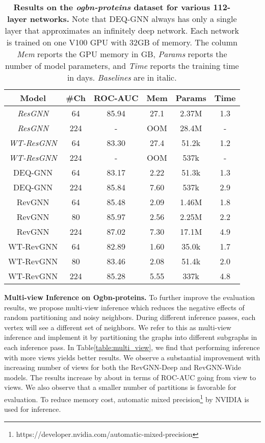 \documentclass{article}
\newcommand{\tblLabel}{Table\xspace}
\newcommand{\mysection}[1]{\vspace{0pt}\noindent\textbf{#1.}}
\begin{document}
\begin{table}[t]
\centering
\setlength{\tabcolsep}{2pt}
\caption{\textbf{Results on the \emph{ogbn-proteins} dataset for various 112-layer networks.} Note that DEQ-GNN always has only a single layer that approximates an infinitely deep network. Each network is trained on one V100 GPU with 32GB of memory. The column \emph{Mem} reports the GPU memory in GB, \emph{Params} reports the number of model parameters, and \emph{Time} reports the training time in days. \textit{Baselines} are in italic.}
\vspace{2pt}
\begin{tabular}{cccccc}
\toprule
  \label{table:ogbn_proteins_ablation}
  \centering
Model & \#Ch & ROC-AUC   & Mem  & Params & Time  \\
\midrule
\textit{ResGNN} & 64 & 85.94 & 27.1 
& 2.37M & 1.3 \\
\textit{ResGNN} & 224 & - & OOM 
& 28.4M & - \\
\midrule
\textit{WT-ResGNN} & 64 & 83.30 & 27.4
& 51.2k & 1.2 \\
\textit{WT-ResGNN} & 224 & - & OOM  
& 537k & - \\
\midrule
DEQ-GNN & 64 & 83.17 & 2.22 
& 51.3k & 1.3 \\
DEQ-GNN & 224 & 85.84 & 7.60 
& 537k & 2.9 \\
\midrule
RevGNN & 64 & 85.48 & 2.09
& 1.46M & 1.8 \\
RevGNN & 80 & 85.97 & 2.56 
& 2.25M & 2.2 \\
RevGNN & 224 & 87.02 & 7.30
& 17.1M & 4.9 \\
\midrule
WT-RevGNN & 64 & 82.89 & 1.60 
& 35.0k & 1.7 \\
WT-RevGNN & 80 & 83.46 & 2.08 
& 51.4k & 2.0 \\
WT-RevGNN & 224 & 85.28 & 5.55 
& 337k & 4.8 \\
\bottomrule
\end{tabular}
\end{table}

\mysection{Multi-view Inference on Ogbn-proteins}
To further improve the evaluation results, we propose multi-view inference which reduces the negative effects of random partitioning and noisy neighbors. During different inference passes, each vertex will see a different set of neighbors. We refer to this as multi-view inference and implement it by partitioning the graphs into different subgraphs in each inference pass. 
In \tblLabel \ref{table:multi_view}, we find that performing inference with more views yields better results. We observe a substantial improvement with increasing number of views for both the RevGNN-Deep and RevGNN-Wide models. The results increase by about  in terms of ROC-AUC going from  view to  views. We also observe that a smaller number of partitions is favorable for evaluation. To reduce memory cost, automatic mixed precision\footnote{https://developer.nvidia.com/automatic-mixed-precision} by NVIDIA is used for inference.
\end{document}
